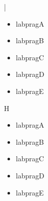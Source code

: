 \documentclass[a4paper]{article}%
\begin{document}
%
%
%
%


\noindent |
\begin{itemize}[labpragA]
\item%
    labpragA
\end{itemize}
\begin{itemize}[labpragB]
\item%
    labpragB
\end{itemize}
\begin{itemize}[labpragC]
\item%
    labpragC
\end{itemize}
\begin{itemize}[labpragD]
\item%
    labpragD
\end{itemize}
\begin{itemize}[labpragE]
\item%
    labpragE
\end{itemize}
H

\par\vspace{\baselineskip}
\begin{itemize}[labpragA]
\item%
    labpragA
\item[\labpragBsym]%
    labpragB
\item[\labpragCsym]%
    labpragC
\item[\labpragDsym]%
    labpragD
\item[\labpragEsym]%
    labpragE
\end{itemize}
\npi%
\end{document}
